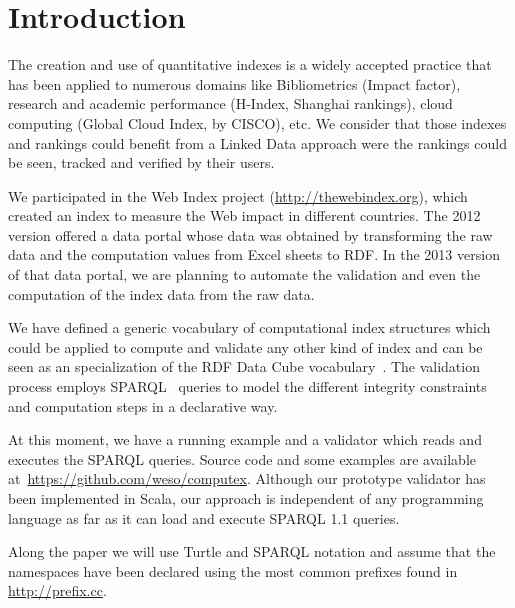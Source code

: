\section{Introduction}

The creation and use of quantitative indexes is a widely 
accepted practice that has been applied to numerous domains like 
Bibliometrics (Impact factor), 
research and academic performance (H-Index, Shanghai
rankings), cloud computing (Global Cloud Index, by CISCO), etc. 
We consider that those indexes and rankings could benefit from a 
 Linked Data approach were the rankings could be seen, tracked and 
 verified by their users.

We participated in the Web Index project
(\url{http://thewebindex.org}), which created an index to measure 
 the Web impact in different countries.
The 2012 version offered a data
portal whose data was obtained 
by transforming the raw data and the computation values 
from Excel sheets to RDF\cite{Alvarez13}. 
In the 2013 version of that data portal, we are planning to automate the
validation and even the computation of the index data from the raw data. 

We have defined a generic vocabulary 
of computational index structures which could be applied to compute and validate any other kind of
index and can be seen as an specialization of the RDF Data Cube
vocabulary~\cite{Cube}.
The validation process employs SPARQL~\cite{SPARQL11} queries to model the 
 different integrity constraints and computation steps in a declarative way.

 At this moment, we have a running example and a validator which 
 reads and executes the SPARQL queries. 
 Source code and some examples are available
 at~\url{https://github.com/weso/computex}. 
 Although our prototype validator has been implemented in Scala, 
 our approach is independent of any programming language 
 as far as it can load and execute SPARQL 1.1 queries.

 Along the paper we will use Turtle and SPARQL notation and assume that the
namespaces have been declared using the most common prefixes found in
\url{http://prefix.cc}.
